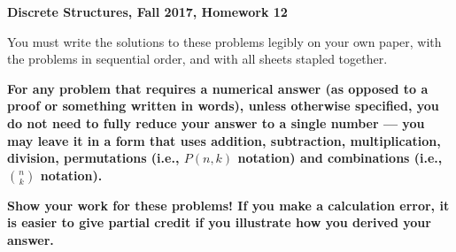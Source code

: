 \documentclass[11pt, letterpaper]{report}
\begin{document}
{\textbf{Discrete Structures, Fall 2017, Homework 12}}

\vspace*{.1in}

You must write the solutions to these problems legibly on your own paper, with
the problems in sequential order, and with all sheets stapled together.

\medskip

\textbf{For any problem that requires a numerical answer (as opposed to a proof or something written in words), unless otherwise specified, you do not need to fully reduce your
answer to a single number --- you may leave it in a form that uses addition, subtraction, multiplication, division, permutations (i.e., $P(n,k)$ notation)
and combinations (i.e., $\binom{n}{k}$ notation).}

\medskip

\textbf{Show your work for these problems! If you make a calculation error, it is easier to give partial credit if you illustrate how you derived your answer.}
\end{document}
